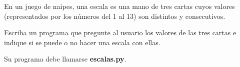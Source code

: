 \documentclass[12pt,spanish,letterpaper]{article}
\begin{document}
  En un juego de naipes,
  una escala es una mano de tres cartas
  cuyos valores (representados por los números del 1 al 13)
  son distintos y consecutivos.

  Escriba un programa que pregunte al usuario
  los valores de las tres cartas
  e indique si se puede o no hacer una escala con ellas.

  \begin{minipage}[t]{.8\textwidth}
    
  \end{minipage}

  \begin{minipage}[t]{.8\textwidth}
    
  \end{minipage}

  Su programa debe llamarse \textbf{escalas.py}.
\end{document}
